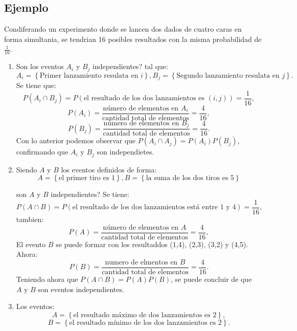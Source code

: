 \documentclass[a4paper,dvipsnames]{book}
\begin{document}
\subsection{Ejemplo}

Condiferando un experimento donde se lancen {\color{orange} dos dados de cuatro
caras} en forma simultania, se tendrian 16 posibles resultados con la misma
probabilidad de \(\frac{1}{16}\).
\begin{enumerate}[{(a) }]
    \item Son los eventos \(A_{i}\) y \(B_{j}\) independientes? tal que:
        \[
        A_{i}=\left\{\text{Primer lanzamiento resulata en }i\right\},
        B_{j}=\left\{\text{Segundo lanzamiento resulata en }j\right\}
        .\]
       Se tiene que:
       \[
       P\left(A_{i}\cap B_{j}\right)= P\left(\text{el resultado de los dos lanzamientos es }\left(i,j\right)\right)=\frac{1}{16}
       ,\]
       \[
       P\left(A_{i}\right)= \frac{\text{número de elementos en }A_{i}}{\text{cantidad total de elementos}}=\frac{4}{16}
       ,\]
       \[
       P\left(B_{j}\right)= \frac{\text{número de elementos en }B_{j}}{\text{cantidad total de elementos}}=\frac{4}{16}
       .\]
Con lo anterior podemos observar que \(P\left(A_{i}\cap A_{j}\right)=P\left(A_{i}\right)P\left(B_{j}\right)\), confirmando que \(A_{i}\) y \(B_{j}\) son independietes.

    \item Siendo \(A\text{ y }B\) los eventos definidos de forma:
        \[ A=\left\{\text{el primer tiro es 1}\right\},B=\left\{ \text{la suma
        de los dos tiros es 5}\right\} \]

    son \(A \text{ y }B\) independientes? Se tiene:
    \[ P\left(A\cap B\right)=P\left(\text{el resultado de los dos lanzamientos
    está entre 1 y 4}\right)=\frac{1}{16} ,\]
    tambien:
    \[
    P\left(A\right)=\frac{\text{número de elementos en \(A\)}}{\text{cantidad total de elementos}}=\frac{4}{16},\]
    El evento \(B\) se puede formar con los resultaddos (1,4), (2,3), (3,2) y
    (4,5). Ahora:
    \[ P\left(B\right)=\frac{\text{numero de elmentos en \(B\)}}{\text{cantidad
    total de elementos}}=\frac{4}{16} .\]
    Teniendo ahora que  \(P\left(A\cap
    B\right)=P\left(A\right)P\left(B\right)\), se puede concluir de que \(A
    \text{ y  }B\) son eventos independientes.

    \item Los eventos:
        \[ A=\left\{\text{el resultado máximo de dos lanzamientos es 2}\right\},\]
        \[B=\left\{\text{el resultado mínimo de los dos lanzamientos es 2}\right\}.\]


\end{enumerate}
\end{document}
